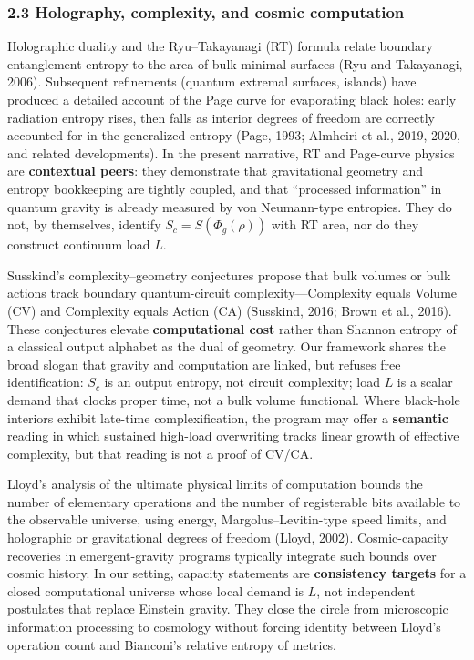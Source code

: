 \documentclass[
  11pt,
]{article}
\begin{document}
\subsubsection{2.3 Holography, complexity, and cosmic computation}\label{holography-complexity-and-cosmic-computation}

Holographic duality and the Ryu--Takayanagi (RT) formula relate boundary entanglement entropy to the area of bulk minimal surfaces (Ryu and Takayanagi, 2006). Subsequent refinements (quantum extremal surfaces, islands) have produced a detailed account of the Page curve for evaporating black holes: early radiation entropy rises, then falls as interior degrees of freedom are correctly accounted for in the generalized entropy (Page, 1993; Almheiri et al., 2019, 2020, and related developments). In the present narrative, RT and Page-curve physics are \textbf{contextual peers}: they demonstrate that gravitational geometry and entropy bookkeeping are tightly coupled, and that ``processed information'' in quantum gravity is already measured by von Neumann-type entropies. They do not, by themselves, identify \(S_c = S(\Phi_g(\rho))\) with RT area, nor do they construct continuum load \(L\).

Susskind's complexity--geometry conjectures propose that bulk volumes or bulk actions track boundary quantum-circuit complexity---Complexity equals Volume (CV) and Complexity equals Action (CA) (Susskind, 2016; Brown et al., 2016). These conjectures elevate \textbf{computational cost} rather than Shannon entropy of a classical output alphabet as the dual of geometry. Our framework shares the broad slogan that gravity and computation are linked, but refuses free identification: \(S_c\) is an output entropy, not circuit complexity; load \(L\) is a scalar demand that clocks proper time, not a bulk volume functional. Where black-hole interiors exhibit late-time complexification, the program may offer a \textbf{semantic} reading in which sustained high-load overwriting tracks linear growth of effective complexity, but that reading is not a proof of CV/CA.

Lloyd's analysis of the ultimate physical limits of computation bounds the number of elementary operations and the number of registerable bits available to the observable universe, using energy, Margolus--Levitin-type speed limits, and holographic or gravitational degrees of freedom (Lloyd, 2002). Cosmic-capacity recoveries in emergent-gravity programs typically integrate such bounds over cosmic history. In our setting, capacity statements are \textbf{consistency targets} for a closed computational universe whose local demand is \(L\), not independent postulates that replace Einstein gravity. They close the circle from microscopic information processing to cosmology without forcing identity between Lloyd's operation count and Bianconi's relative entropy of metrics.
\end{document}
